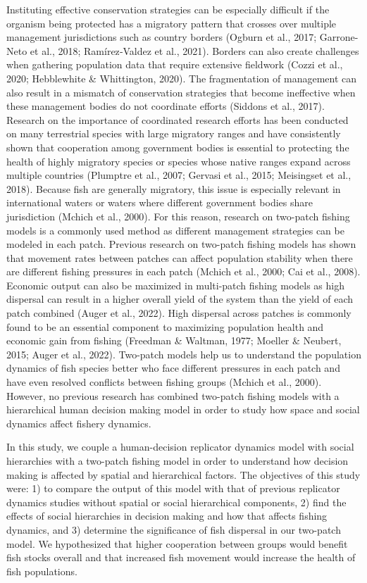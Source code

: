\documentclass[
]{article}
\begin{document}
Instituting effective conservation strategies can be especially difficult if the organism being protected has a migratory pattern that crosses over multiple management jurisdictions such as country borders (Ogburn et al., 2017; Garrone-Neto et al., 2018; Ramírez‐Valdez et al., 2021). Borders can also create challenges when gathering population data that require extensive fieldwork (Cozzi et al., 2020; Hebblewhite \& Whittington, 2020). The fragmentation of management can also result in a mismatch of conservation strategies that become ineffective when these management bodies do not coordinate efforts (Siddons et al., 2017). Research on the importance of coordinated research efforts has been conducted on many terrestrial species with large migratory ranges and have consistently shown that cooperation among government bodies is essential to protecting the health of highly migratory species or species whose native ranges expand across multiple countries (Plumptre et al., 2007; Gervasi et al., 2015; Meisingset et al., 2018). Because fish are generally migratory, this issue is especially relevant in international waters or waters where different government bodies share jurisdiction (Mchich et al., 2000). For this reason, research on two-patch fishing models is a commonly used method as different management strategies can be modeled in each patch. Previous research on two-patch fishing models has shown that movement rates between patches can affect population stability when there are different fishing pressures in each patch (Mchich et al., 2000; Cai et al., 2008). Economic output can also be maximized in multi-patch fishing models as high dispersal can result in a higher overall yield of the system than the yield of each patch combined (Auger et al., 2022). High dispersal across patches is commonly found to be an essential component to maximizing population health and economic gain from fishing (Freedman \& Waltman, 1977; Moeller \& Neubert, 2015; Auger et al., 2022). Two-patch models help us to understand the population dynamics of fish species better who face different pressures in each patch and have even resolved conflicts between fishing groups (Mchich et al., 2000). However, no previous research has combined two-patch fishing models with a hierarchical human decision making model in order to study how space and social dynamics affect fishery dynamics.

In this study, we couple a human-decision replicator dynamics model with social hierarchies with a two-patch fishing model in order to understand how decision making is affected by spatial and hierarchical factors. The objectives of this study were: 1) to compare the output of this model with that of previous replicator dynamics studies without spatial or social hierarchical components, 2) find the effects of social hierarchies in decision making and how that affects fishing dynamics, and 3) determine the significance of fish dispersal in our two-patch model. We hypothesized that higher cooperation between groups would benefit fish stocks overall and that increased fish movement would increase the health of fish populations.
\end{document}
